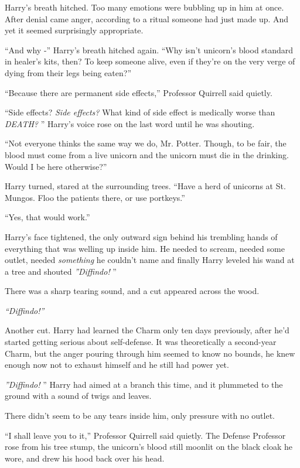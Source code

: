 Harry's breath hitched. Too many emotions were bubbling up in him at
once. After denial came anger, according to a ritual someone had just
made up. And yet it seemed surprisingly appropriate.

``And why -'' Harry's breath hitched again. ``Why isn't unicorn's blood
standard in healer's kits, then? To keep someone alive, even if they're
on the very verge of dying from their legs being eaten?''

``Because there are permanent side effects,'' Professor Quirrell said
quietly.

``Side effects? \emph{Side effects?} What kind of side effect is
medically worse than \emph{DEATH?} '' Harry's voice rose on the last word
until he was shouting.

``Not everyone thinks the same way we do, Mr. Potter. Though, to be
fair, the blood must come from a live unicorn and the unicorn must die
in the drinking. Would I be here otherwise?''

Harry turned, stared at the surrounding trees. ``Have a herd of unicorns
at St. Mungos. Floo the patients there, or use portkeys.''

``Yes, that would work.''

Harry's face tightened, the only outward sign behind his trembling hands
of everything that was welling up inside him. He needed to scream,
needed some outlet, needed \emph{something} he couldn't name and finally
Harry leveled his wand at a tree and shouted \emph{''Diffindo!} ''

There was a sharp tearing sound, and a cut appeared across the wood.

\emph{``Diffindo!''}

Another cut. Harry had learned the Charm only ten days previously, after
he'd started getting serious about self-defense. It was theoretically a
second-year Charm, but the anger pouring through him seemed to know no
bounds, he knew enough now not to exhaust himself and he still had power
yet.

\emph{''Diffindo!} '' Harry had aimed at a branch this time, and it
plummeted to the ground with a sound of twigs and leaves.

There didn't seem to be any tears inside him, only pressure with no
outlet.

``I shall leave you to it,'' Professor Quirrell said quietly. The
Defense Professor rose from his tree stump, the unicorn's blood still
moonlit on the black cloak he wore, and drew his hood back over his
head.
